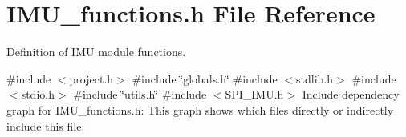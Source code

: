 \section{I\+M\+U\+\_\+functions.\+h File Reference}
\label{_i_m_u__functions_8h}


Definition of I\+MU module functions.  


{\ttfamily \#include $<$project.\+h$>$}\newline
{\ttfamily \#include \char`\"{}globals.\+h\char`\"{}}\newline
{\ttfamily \#include $<$stdlib.\+h$>$}\newline
{\ttfamily \#include $<$stdio.\+h$>$}\newline
{\ttfamily \#include \char`\"{}utils.\+h\char`\"{}}\newline
{\ttfamily \#include $<$S\+P\+I\+\_\+\+I\+M\+U.\+h$>$}\newline
Include dependency graph for I\+M\+U\+\_\+functions.\+h\+:
This graph shows which files directly or indirectly include this file\+:
